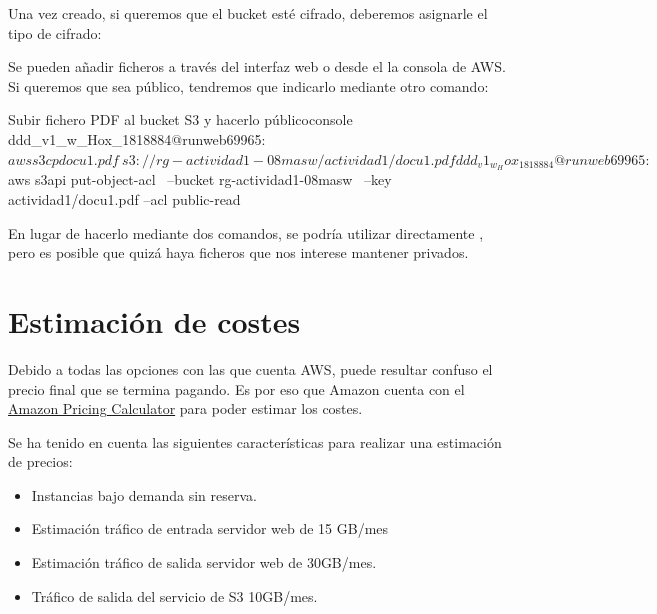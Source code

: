 \documentclass{\ClassPath/viu-tfm-template}
\begin{document}
Una vez creado, si queremos que el bucket esté cifrado, deberemos asignarle el tipo de cifrado:



Se pueden añadir ficheros a través del interfaz web o desde el la consola de AWS. Si queremos que sea público, tendremos que indicarlo mediante otro comando:

\begin{mycode}{Subir fichero PDF al bucket S3 y hacerlo público}{console}{}
ddd_v1_w_Hox_1818884@runweb69965:~$ aws s3 cp docu1.pdf \
  s3://rg-actividad1-08masw/actividad1/docu1.pdf

ddd_v1_w_Hox_1818884@runweb69965:~$ aws s3api put-object-acl \
--bucket rg-actividad1-08masw \
--key actividad1/docu1.pdf --acl public-read
\end{mycode}

En lugar de hacerlo mediante dos comandos, se podría utilizar directamente , pero es posible que quizá haya ficheros que nos interese mantener privados.

\chapter{Estimación de costes}
Debido a todas las opciones con las que cuenta AWS, puede resultar confuso el precio final que se termina pagando. Es por eso que Amazon cuenta con el \href{https://calculator.aws/}{Amazon Pricing Calculator} para poder estimar los costes.

Se ha tenido en cuenta las siguientes características para realizar una estimación de precios:

\begin{itemize}
    \vspace{-15 pt}
    \item Instancias bajo demanda sin reserva.
    \item Estimación tráfico de entrada servidor web de 15 GB/mes
    \item Estimación tráfico de salida servidor web de 30GB/mes.
    \item Tráfico de salida del servicio de S3 10GB/mes.
\end{itemize}
\end{document}
